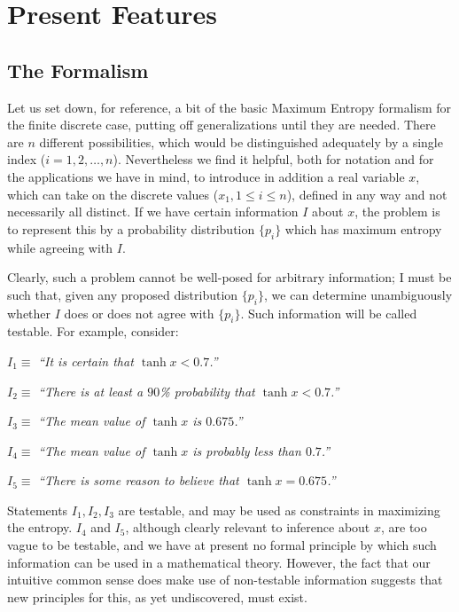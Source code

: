 \section{Present Features}
\label{sec:B}
\subsection{The Formalism}
Let us set down, for reference, a bit of the basic Maximum Entropy formalism for the finite discrete case, putting off generalizations until they are needed.
There are $n$ different possibilities, which would be distinguished adequately by a single index ($i=1,2,\ldots,n$).
Nevertheless we find it helpful, both for notation and for the applications we have in mind, to introduce in addition a real variable $x$, which can take on the discrete values ($x_1, 1 \leq i \leq n$), defined in any way and not necessarily all distinct.
If we have certain information $I$ about $x$, the problem is to represent this by a probability distribution $\{p_i\}$ which has maximum entropy while agreeing with $I$.

Clearly, such a problem cannot be well-posed for arbitrary information; I must be such that, given any proposed distribution $\{p_i\}$, we can determine unambiguously whether $I$ does or does not agree with $\{p_i\}$.
Such information will be called testable.
For example, consider:

\vspace{0.5\baselineskip}
	$I_1 \equiv$ \emph{``It is certain that $\tanh x < 0.7$.''}

	$I_2 \equiv$ \emph{``There is at least a $90$\% probability that $\tanh x < 0.7$.''}

	$I_3 \equiv$ \emph{``The mean value of $\tanh x$ is $0.675$.''}

	$I_4 \equiv$ \emph{``The mean value of $\tanh x$ is probably less than $0.7$.''}

	$I_5 \equiv$ \emph{``There is some reason to believe that $\tanh x = 0.675$.''}

\vspace{0.5\baselineskip}
Statements $I_1, I_2, I_3$ are testable, and may be used as constraints in maximizing the entropy.
$I_4$ and $I_5$, although clearly relevant to inference about $x$, are too vague to be testable, and we have at present no formal principle by which such information can be used in a mathematical theory.
However, the fact that our intuitive common sense does make use of non-testable information suggests that new principles for this, as yet undiscovered, must exist.

